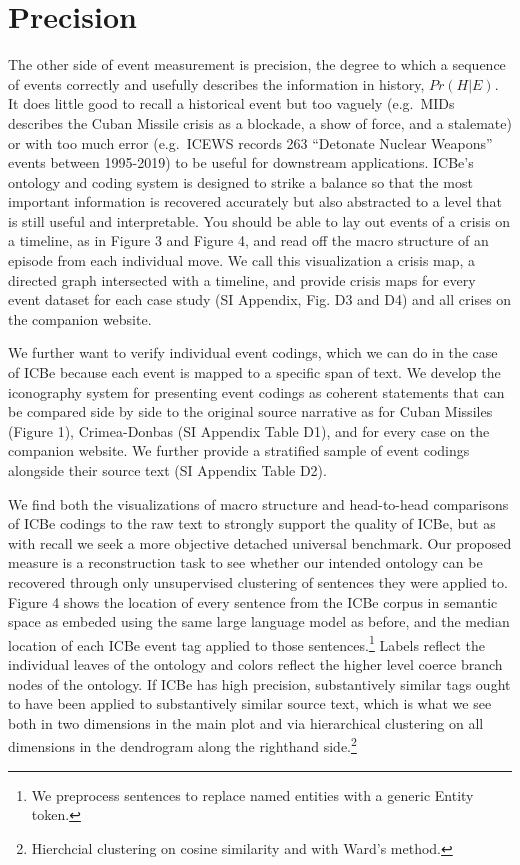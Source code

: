 \documentclass{article}
\begin{document}
\hypertarget{precision}{%
\section{Precision}\label{precision}}

The other side of event measurement is precision, the degree to which a
sequence of events correctly and usefully describes the information in
history, \(Pr(H|E)\). It does little good to recall a historical event
but too vaguely (e.g.~MIDs describes the Cuban Missile crisis as a
blockade, a show of force, and a stalemate) or with too much error
(e.g.~ICEWS records 263 ``Detonate Nuclear Weapons'' events between
1995-2019) to be useful for downstream applications. ICBe's ontology and
coding system is designed to strike a balance so that the most important
information is recovered accurately but also abstracted to a level that
is still useful and interpretable. You should be able to lay out events
of a crisis on a timeline, as in Figure 3 and Figure 4, and read off the
macro structure of an episode from each individual move. We call this
visualization a crisis map, a directed graph intersected with a
timeline, and provide crisis maps for every event dataset for each case
study (SI Appendix, Fig. D3 and D4) and all crises on the companion
website.

We further want to verify individual event codings, which we can do in
the case of ICBe because each event is mapped to a specific span of
text. We develop the iconography system for presenting event codings as
coherent statements that can be compared side by side to the original
source narrative as for Cuban Missiles (Figure 1), Crimea-Donbas (SI
Appendix Table D1), and for every case on the companion website. We
further provide a stratified sample of event codings alongside their
source text (SI Appendix Table D2).

We find both the visualizations of macro structure and head-to-head
comparisons of ICBe codings to the raw text to strongly support the
quality of ICBe, but as with recall we seek a more objective detached
universal benchmark. Our proposed measure is a reconstruction task to
see whether our intended ontology can be recovered through only
unsupervised clustering of sentences they were applied to. Figure 4
shows the location of every sentence from the ICBe corpus in semantic
space as embeded using the same large language model as before, and the
median location of each ICBe event tag applied to those
sentences.\footnote{We preprocess sentences to replace named entities
  with a generic Entity token.} Labels reflect the individual leaves of
the ontology and colors reflect the higher level coerce branch nodes of
the ontology. If ICBe has high precision, substantively similar tags
ought to have been applied to substantively similar source text, which
is what we see both in two dimensions in the main plot and via
hierarchical clustering on all dimensions in the dendrogram along the
righthand side.\footnote{Hierchcial clustering on cosine similarity and
  with Ward's method.}
\end{document}
